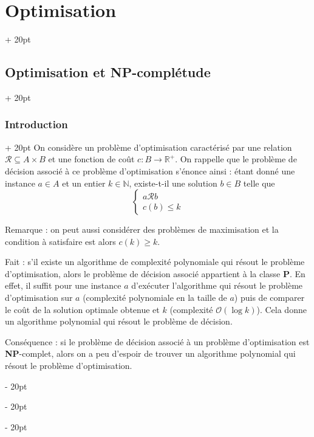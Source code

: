 \documentclass[a4paper, 12pt, twoside]{article}
\newcommand{\N}{\mathbb{N}} %
\newcommand{\R}{\mathbb{R}} %
\renewcommand{\le}{\leqslant}
\renewcommand{\ge}{\geqslant}
\newcommand{\ind}[1][20pt]{\advance\leftskip + #1}
\newcommand{\deind}[1][20pt]{\advance\leftskip - #1}
\newenvironment{indt}[2][20pt]{#2 \par \ind[#1]}{\par \deind} %
\newcommand{\1}{\mathbbm 1}
\begin{document}
\begin{indt}{\section{Optimisation}}
        \begin{indt}{\subsection{Optimisation et \textbf{NP}-complétude}}
            \begin{indt}{\subsubsection{Introduction}}
                On considère un problème d'optimisation caractérisé par une relation $\mathcal R \subseteq A \times B$ et une fonction de coût $c : B \longrightarrow \R^+$.
                On rappelle que le problème de décision associé à ce problème d'optimisation s'énonce ainsi : étant donné une instance $a \in A$ et un entier $k \in \N$, existe-t-il une solution $b \in B$ telle que
                \[
                    \begin{cases}
                        a \mathcal R b
                        \\
                        c(b) \le k
                    \end{cases}
                \]

                Remarque : on peut aussi considérer des problèmes de maximisation et la condition à satisfaire est alors $c(k) \ge k$.

                \vspace{6pt}
                
                Fait : s'il existe un algorithme de complexité polynomiale qui résout le problème d'optimisation, alors le problème de décision associé appartient à la classe $\mathbf{P}$.
                En effet, il suffit pour une instance $a$ d'exécuter l'algorithme qui résout le problème d'optimisation sur $a$ (complexité polynomiale en la taille de $a$) puis de comparer le coût de la solution optimale obtenue et $k$ (complexité $\mathcal O(\log k)$).
                Cela donne un algorithme polynomial qui résout le problème de décision.

                \vspace{12pt}
                
                Conséquence : si le problème de décision associé à un problème d'optimisation est \textbf{NP}-complet, alors on a peu d'espoir de trouver un algorithme polynomial qui résout le problème d'optimisation.
            \end{indt}


\end{indt}
\end{indt}
\end{document}
